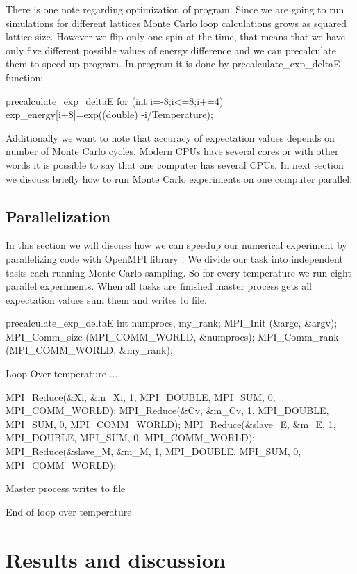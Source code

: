 \documentclass[10pt]{article}
\begin{document}
There is one note regarding optimization of program. Since we are going to run simulations for different lattices Monte Carlo loop calculations grows as squared lattice size. However we flip only one spin at the time, that means that we have only five different possible values of energy difference and we can precalculate them to speed up program. In program it is done by precalculate\_exp\_deltaE function:
\begin{pseudolisting}{precalculate\_exp\_deltaE}
for (int i=-8;i<=8;i+=4){
  exp_energy[i+8]=exp((double) -i/Temperature);
}

\end{pseudolisting}
Additionally we want to note that accuracy of expectation values depends on number of Monte Carlo cycles. Modern CPUs have several cores or with other words it is possible to say that one computer has several CPUs. In next section we discuss briefly how to run Monte Carlo experiments on one computer
parallel. 
\subsection{Parallelization}
In this section we will discuss how we can speedup our numerical experiment by parallelizing code with OpenMPI library \cite{Gabriel}. 
We divide our task into independent tasks each running Monte Carlo sampling. So for every temperature we run eight parallel experiments.
When all tasks are finished master process gets all expectation values sum them and writes to file.

\begin{pseudolisting}{precalculate\_exp\_deltaE}
int numprocs, my_rank;
MPI_Init (&argc, &argv);
MPI_Comm_size (MPI_COMM_WORLD, &numprocs);
MPI_Comm_rank (MPI_COMM_WORLD, &my_rank);

Loop Over temperature {
    ...
  }

MPI_Reduce(&Xi, &m_Xi, 1, MPI_DOUBLE, 
          MPI_SUM, 0, MPI_COMM_WORLD);
MPI_Reduce(&Cv, &m_Cv, 1, MPI_DOUBLE, 
          MPI_SUM, 0, MPI_COMM_WORLD);
MPI_Reduce(&slave_E, &m_E, 1, MPI_DOUBLE, 
          MPI_SUM, 0, MPI_COMM_WORLD);
MPI_Reduce(&slave_M, &m_M, 1, MPI_DOUBLE, 
          MPI_SUM, 0, MPI_COMM_WORLD);

Master process writes to file

End of loop over temperature

\end{pseudolisting}




\section{Results and discussion}\label{results}
\end{document}
